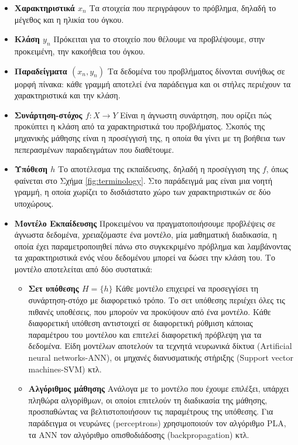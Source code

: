 \begin{itemize}
	\item \textbf{Χαρακτηριστικά $x_n$} Τα στοιχεία που περιγράφουν το πρόβλημα, δηλαδή το μέγεθος και η ηλικία του όγκου.
	\item \textbf{Κλάση $y_n$} Πρόκειται για το στοιχείο που θέλουμε να προβλέψουμε, στην προκειμένη, την κακοήθεια του όγκου.
	\item \textbf{Παραδείγματα $(x_n, y_n)$} Τα δεδομένα του προβλήματος δίνονται συνήθως σε μορφή πίνακα: κάθε γραμμή αποτελεί ένα παράδειγμα και οι στήλες περιέχουν τα χαρακτηριστικά και την κλάση.
	\item \textbf{Συνάρτηση-στόχος $f: X \rightarrow Y$} Είναι η άγνωστη συνάρτηση, που ορίζει πώς προκύπτει η κλάση από τα χαρακτηριστικά του προβλήματος. Σκοπός της μηχανικής μάθησης είναι η προσέγγισή της, η οποία θα γίνει με τη βοήθεια των πεπερασμένων παραδειγμάτων που διαθέτουμε.
	\item \textbf{Υπόθεση $h$} Το αποτέλεσμα της εκπαίδευσης, δηλαδή η προσέγγιση της $f$, όπως φαίνεται στο Σχήμα \ref{fig:terminology}. Στο παράδειγμά μας είναι μια νοητή γραμμή, η οποία χωρίζει το δισδιάστατο χώρο των χαρακτηριστικών σε δύο υποχώρους.
	\item \textbf{Μοντέλο Εκπαίδευσης} Προκειμένου να πραγματοποιήσουμε προβλέψεις σε άγνωστα δεδομένα, χρειαζόμαστε ένα μοντέλο, μία μαθηματική διαδικασία, η οποία έχει παραμετροποιηθεί πάνω στο συγκεκριμένο πρόβλημα και λαμβάνοντας τα χαρακτηριστικά ενός νέου δεδομένου μπορεί να δώσει την κλάση του. Το μοντέλο αποτελείται από δύο συστατικά:
	\begin{itemize}
		\item \textbf{Σετ υπόθεσης $H = \{h\}$} Κάθε μοντέλο επιχειρεί να προσεγγίσει τη συνάρτηση-στόχο με διαφορετικό τρόπο. Το σετ υπόθεσης περιέχει όλες τις πιθανές υποθέσεις, που μπορούν να προκύψουν από ένα μοντέλο. Κάθε διαφορετική υπόθεση αντιστοιχεί σε διαφορετική ρύθμιση κάποιας παραμέτρου του μοντέλου και επιτελεί διαφορετική πρόβλεψη για τα δεδομένα. Είδη μοντέλων αποτελούν τα τεχνητά νευρωνικά δίκτυα (Artificial neural networks-ANN), οι μηχανές διανυσματικής στήριξης (Support vector machines-SVM) κτλ.
		\item \textbf{Αλγόριθμος μάθησης} Ανάλογα με το μοντέλο που έχουμε επιλέξει, υπάρχει πληθώρα αλγορίθμων, οι οποίοι επιτελούν τη διαδικασία της μάθησης, προσπαθώντας να βελτιστοποιήσουν τις παραμέτρους της υπόθεσης. Για παράδειγμα οι νευρώνες (perceptrons) χρησιμοποιούν τον αλγόριθμο PLA, τα \gls{ANN} τον αλγόριθμο οπισθοδιάδοσης (backpropagation) κτλ.    
	\end{itemize}
\end{itemize}

